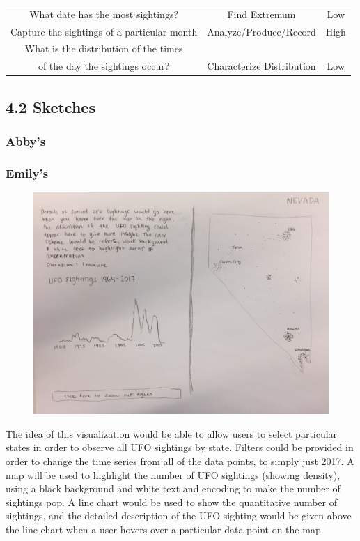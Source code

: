 \documentclass{neu_handout}
\begin{document}
\begin{table}[h]
\begin{tabular}{c c c}
What date has the most sightings? &
Find Extremum &
Low \\[1ex] %

Capture the sightings of a particular month &
Analyze/Produce/Record &
High \\[1ex] %

What is the distribution of the times\\ of the day the sightings occur? &
Characterize Distribution &
Low \\


\hline 
\end{tabular}
\label{tab:PPer}
\end{table}

\subsection*{4.2 Sketches}

\subsubsection*{Abby's}

\subsubsection*{Emily's}
\begin{figure}[h]
\centering
{
\includegraphics[width=0.5\linewidth]{emily1}
}
\end{figure}

The idea of this visualization would be able to allow users to select particular states in order to observe all UFO sightings by state. Filters could be provided in order to change the time series from all of the data points, to simply just 2017. A map will be used to highlight the number of UFO sightings (showing density), using a black background and white text and encoding to make the number of sightings pop. A line chart would be used to show the quantitative number of sightings, and the detailed description of the UFO sighting would be given above the line chart when a user hovers over a particular data point on the map.\\\\
\end{document}

